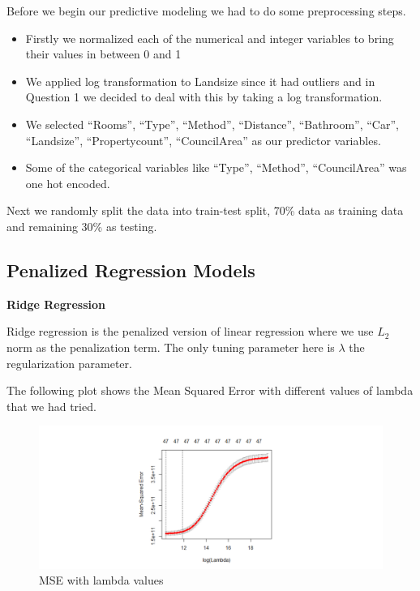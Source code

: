 \documentclass[]{article}
\providecommand{\tightlist}{%
  \setlength{\itemsep}{0pt}\setlength{\parskip}{0pt}}
\begin{document}
Before we begin our predictive modeling we had to do some preprocessing
steps.

\begin{itemize}
\tightlist
\item
  Firstly we normalized each of the numerical and integer variables to
  bring their values in between 0 and 1
\item
  We applied log transformation to Landsize since it had outliers and in
  Question 1 we decided to deal with this by taking a log
  transformation.
\item
  We selected ``Rooms'', ``Type'', ``Method'', ``Distance'',
  ``Bathroom'', ``Car'', ``Landsize'', ``Propertycount'',
  ``CouncilArea'' as our predictor variables.
\item
  Some of the categorical variables like ``Type'', ``Method'',
  ``CouncilArea'' was one hot encoded.
\end{itemize}

Next we randomly split the data into train-test split, 70\% data as
training data and remaining 30\% as testing.

\subsection{Penalized Regression
Models}\label{penalized-regression-models}

\textbf{Ridge Regression}

Ridge regression is the penalized version of linear regression where we
use \(L_2\) norm as the penalization term. The only tuning parameter
here is \(\lambda\) the regularization parameter.

The following plot shows the Mean Squared Error with different values of
lambda that we had tried.

\begin{figure}
\centering
\includegraphics{Report_files/figure-latex/unnamed-chunk-14-1.pdf}
\caption{MSE with lambda values}
\end{figure}
\end{document}

